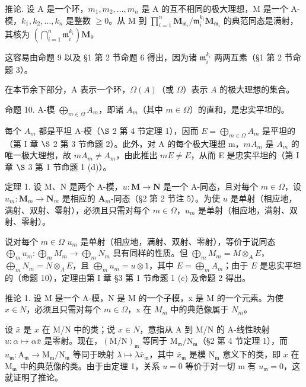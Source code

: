推论. 设 A 是一个环，\(m_{1}, m_{2}, \ldots, m_{n}\) 是 A 的互不相同的极大理想，M 是一个 A-模，\(k_{1}, k_{2}, \ldots, k_{n}\) 是整数 \(\geqslant 0\)。从 M 到 \(\prod_{i=1}^{n} \mathbf{M}_{\mathfrak{m}_{i}}/\mathfrak{m}_{i}^{k_{i}} \mathbf{M}_{\mathfrak{m}_{i}}\) 的典范同态是满射，其核为 \(\left(\bigcap_{i=1}^{n} \mathfrak{m}_{i}^{k_{i}}\right) \mathbf{M}\)。

这容易由命题 9 以及 §1 第 2 节命题 6 得出，因为诸 \(\mathfrak{m}_{i}^{k_{i}}\) 两两互素（§1 第 2 节命题 3）。

在本节余下部分，A 表示一个环，\(\Omega(A)\)（或 \(\Omega\)）表示 \(A\) 的极大理想的集合。

命题 10. A-模 \(\bigoplus_{m\in\Omega}A_m\)，即诸 \(A_m\)（其中 \(m\in\Omega\)）的直和，是忠实平坦的。

每个 \(A_{m}\) 都是平坦 A-模（\(\S\) 2 第 4 节定理 1），因而 \(E = \bigoplus_{m \in \Omega} A_{m}\) 是平坦的（第 I 章 \(\S\) 2 第 3 节命题 2）。此外，对 A 的每个极大理想 m，\(mA_{m}\) 是 \(A_{m}\) 的唯一极大理想，故 \(mA_{m} \neq A_{m}\)，由此推出 \(mE \neq E\)，从而 E 是忠实平坦的（第 I 章 \(\S\) 3 第 1 节命题 1 (d)）。

定理 1. 设 M、N 是两个 A-模，\(u: \mathbf{M} \to \mathbf{N}\) 是一个 A-同态，且对每个 \(m \in \Omega\)，设 \(u_m: \mathbf{M}_m \to \mathbf{N}_m\) 是相应的 \(\mathbf{A}_m\)-同态（§2 第 2 节注 5）。为使 \(u\) 是单射（相应地，满射、双射、零射），必须且只需对每个 \(m \in \Omega\)，\(u_m\) 是单射（相应地，满射、双射、零射）。

说对每个 \(m \in \Omega\) \(u_m\) 是单射（相应地，满射、双射、零射），等价于说同态 \(\bigoplus_{m} u_m: \bigoplus_{m} M_m \to \bigoplus_{m} N_m\) 具有同样的性质。但 \(\bigoplus_{m} M_m = M \otimes_A E\)，\(\bigoplus_{m} N_m = N \otimes_A E\)，且 \(\bigoplus_{m} u_m = u \otimes 1\)，其中 \(E = \bigoplus_{m} A_m\)；由于 \(E\) 是忠实平坦的（命题 10），定理由第 I 章 §3 第 1 节命题 1 (c) 及命题 2 得出。

推论 1. 设 M 是一个 A-模，N 是 M 的一个子模，x 是 M 的一个元素。为使 \(x \in N\)，必须且只需对每个 \(m \in \Omega\)，x 在 \(M_{m}\) 中的典范像属于 \(N_{m}\)。

设 \(\bar{x}\) 是 \(x\) 在 M/N 中的类；说 \(x \in N\)，意指从 A 到 M/N 的 A-线性映射 \(u: \alpha \mapsto \alpha \bar{x}\) 是零射。现在，\((\mathrm{M} / \mathrm{N})_{\mathfrak{m}}\) 等同于 \(\mathrm{M}_{\mathfrak{m}} / \mathrm{N}_{\mathfrak{m}}\)（§2 第 4 节定理 1），而 \(u_{\mathfrak{m}}: \mathrm{A}_{\mathfrak{m}} \to \mathrm{M}_{\mathfrak{m}} / \mathrm{N}_{\mathfrak{m}}\) 等同于映射 \(\lambda \mapsto \lambda \bar{x}_{\mathfrak{m}}\)，其中 \(\bar{x}_{\mathfrak{m}}\) 是模 \(\mathrm{N}_{\mathfrak{m}}\) 意义下的类，即 \(x\) 在 \(\mathrm{M}_{\mathfrak{m}}\) 中的典范像的类。由于由定理 1，关系 \(u = 0\) 等价于对一切 m 有 \(u_{\mathfrak{m}} = 0\)，这就证明了推论。

